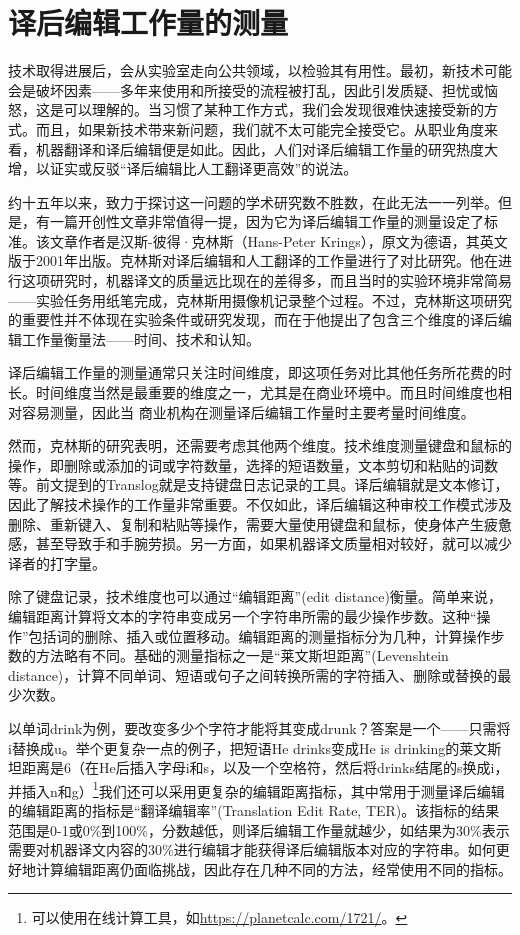 \documentclass[output=paper,colorlinks,citecolor=brown]{langscibook}
\begin{document}
\section{译后编辑工作量的测量}

技术取得进展后，会从实验室走向公共领域，以检验其有用性。最初，新技术可能会是破坏因素——多年来使用和所接受的流程被打乱，因此引发质疑、担忧或恼怒，这是可以理解的。当习惯了某种工作方式，我们会发现很难快速接受新的方式。而且，如果新技术带来新问题，我们就不太可能完全接受它。从职业角度来看，机器翻译和译后编辑便是如此。因此，人们对译后编辑工作量的研究热度大增，以证实或反驳“译后编辑比人工翻译更高效”的说法。

约十五年以来，致力于探讨这一问题\citep{Koponen2016}的学术研究数不胜数，在此无法一一列举。但是，有一篇开创性文章非常值得一提，因为它为译后编辑工作量的测量设定了标准。该文章作者是汉斯-彼得·克林斯（Hans-Peter Krings），原文为德语，其英文版于2001年出版\citep{Krings2001}。克林斯对译后编辑和人工翻译的工作量进行了对比研究。他在进行这项研究时，机器译文的质量远比现在的差得多，而且当时的实验环境非常简易——实验任务用纸笔完成，克林斯用摄像机记录整个过程。不过，克林斯这项研究的重要性并不体现在实验条件或研究发现，而在于他提出了包含三个维度的译后编辑工作量衡量法——时间、技术和认知。

译后编辑工作量的测量通常只关注时间维度，即这项任务对比其他任务所花费的时长。时间维度当然是最重要的维度之一，尤其是在商业环境中。而且时间维度也相对容易测量，因此当 商业机构在测量译后编辑工作量时主要考量时间维度。

然而，克林斯的研究表明，还需要考虑其他两个维度。技术维度测量键盘和鼠标的操作，即删除或添加的词或字符数量，选择的短语数量，文本剪切和粘贴的词数等。前文提到的Translog就是支持键盘日志记录的工具。译后编辑就是文本修订，因此了解技术操作的工作量非常重要。不仅如此，译后编辑这种审校工作模式涉及删除、重新键入、复制和粘贴等操作，需要大量使用键盘和鼠标，使身体产生疲惫感，甚至导致手和手腕劳损。另一方面，如果机器译文质量相对较好，就可以减少译者的打字量。

除了键盘记录，技术维度也可以通过“编辑距离”(edit distance)衡量。简单来说，编辑距离计算将文本的字符串变成另一个字符串所需的最少操作步数。这种“操作”包括词的删除、插入或位置移动。编辑距离的测量指标分为几种，计算操作步数的方法略有不同。基础的测量指标之一是“莱文斯坦距离”(Levenshtein distance)，计算不同单词、短语或句子之间转换所需的字符插入、删除或替换的最少次数。

以单词drink为例，要改变多少个字符才能将其变成drunk？答案是一个——只需将i替换成u。举个更复杂一点的例子，把短语He drinks变成He is drinking的莱文斯坦距离是6（在He后插入字母i和s，以及一个空格符，然后将drinks结尾的s换成i，并插入n和g）\footnote{可以使用在线计算工具，如\url{https://planetcalc.com/1721/}。}我们还可以采用更复杂的编辑距离指标，其中常用于测量译后编辑的编辑距离的指标是“翻译编辑率”(Translation Edit Rate, TER)\citep{snover-etal-2006-study}。该指标的结果范围是0-1或0\%到100\%，分数越低，则译后编辑工作量就越少，如结果为30\%表示需要对机器译文内容的30\%进行编辑才能获得译后编辑版本对应的字符串。如何更好地计算编辑距离仍面临挑战，因此存在几种不同的方法，经常使用不同的指标。
\end{document}
